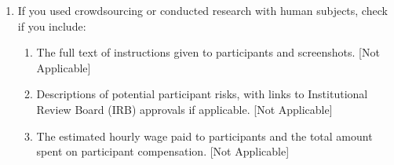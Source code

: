 \begin{enumerate}
  \item If you used crowdsourcing or conducted research with human subjects, check if you include:
  \begin{enumerate}
    \item The full text of instructions given to participants and screenshots. [Not Applicable]
    \item Descriptions of potential participant risks, with links to Institutional Review Board (IRB) approvals if applicable. [Not Applicable]
    \item The estimated hourly wage paid to participants and the total amount spent on participant compensation. [Not Applicable] 

  \end{enumerate}

\end{enumerate}



